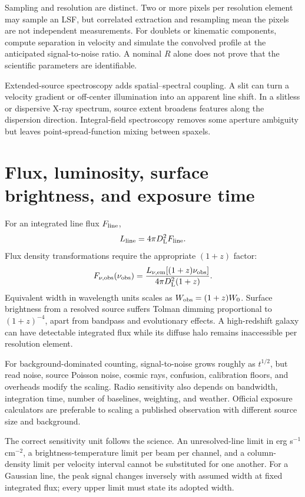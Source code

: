 Sampling and resolution are distinct. Two or more pixels per resolution
element may sample an LSF, but correlated extraction and resampling mean the
pixels are not independent measurements. For doublets or kinematic
components, compute separation in velocity and simulate the convolved profile
at the anticipated signal-to-noise ratio. A nominal $R$ alone does not prove
that the scientific parameters are identifiable.

Extended-source spectroscopy adds spatial--spectral coupling. A slit can turn
a velocity gradient or off-center illumination into an apparent line shift.
In a slitless or dispersive X-ray spectrum, source extent broadens features
along the dispersion direction. Integral-field spectroscopy removes some
aperture ambiguity but leaves point-spread-function mixing between spaxels.

\section{Flux, luminosity, surface brightness, and exposure time}

For an integrated line flux $F_{\rm line}$,
\begin{equation}
 L_{\rm line}=4\pi D_{\rm L}^{2}F_{\rm line}.
 \label{eq:line-luminosity}
\end{equation}
Flux density transformations require the appropriate $(1+z)$ factor:
\begin{equation}
 F_{\nu,\rm obs}(\nu_{\rm obs})=
 \frac{L_{\nu,\rm em}[(1+z)\nu_{\rm obs}]}
 {4\pi D_{\rm L}^{2}(1+z)}.
\end{equation}
Equivalent width in wavelength units scales as
$W_{\rm obs}=(1+z)W_0$. Surface brightness from a resolved source suffers
Tolman dimming proportional to $(1+z)^{-4}$, apart from bandpass and
evolutionary effects. A high-redshift galaxy can have detectable integrated
flux while its diffuse halo remains inaccessible per resolution element.

For background-dominated counting, signal-to-noise grows roughly as
$t^{1/2}$, but read noise, source Poisson noise, cosmic rays, confusion,
calibration floors, and overheads modify the scaling. Radio sensitivity also
depends on bandwidth, integration time, number of baselines, weighting, and
weather. Official exposure calculators are preferable to scaling a published
observation with different source size and background.

The correct sensitivity unit follows the science. An unresolved-line limit in
erg s$^{-1}$ cm$^{-2}$, a brightness-temperature limit per beam per channel,
and a column-density limit per velocity interval cannot be substituted for
one another. For a Gaussian line, the peak signal changes inversely with
assumed width at fixed integrated flux; every upper limit must state its
adopted width.

